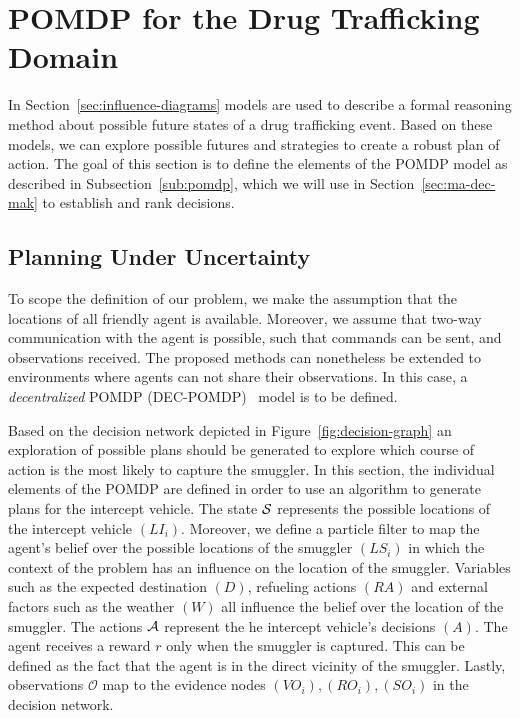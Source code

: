 \documentclass[conference]{IEEEtran}
\begin{document}

\section{POMDP for the Drug Trafficking Domain}
\label{sec:scenario-based-dm}

In Section~\ref{sec:influence-diagrams} models are used to describe a formal reasoning method about possible future states of a drug trafficking event. Based on these models, we can explore possible futures and strategies to create a robust plan of action. The goal of this section is to define the elements of the POMDP model as described in Subsection~\ref{sub:pomdp}, which we will use in Section~\ref{sec:ma-dec-mak} to establish and rank decisions.

\subsection{Planning Under Uncertainty}
\label{sub:plan-uncert}

To scope the definition of our problem, we make the assumption that the locations of all friendly agent is available. Moreover, we assume that two-way communication with the agent is possible, such that commands can be sent, and observations received. The proposed methods can nonetheless be extended to environments where agents can not share their observations. In this case, a \emph{decentralized} POMDP (DEC-POMDP)~\cite{dec-pomdp,oliehoek2008optimal} model is to be defined.

Based on the decision network depicted in Figure~\ref{fig:decision-graph} an exploration of possible plans should be generated to explore which course of action is the most likely to capture the smuggler. In this section, the individual elements of the POMDP are defined in order to use an algorithm to generate plans for the intercept vehicle. The state $\S$ represents the possible locations of the intercept vehicle $(LI_i)$. Moreover, we define a particle filter to map the agent's belief over the possible locations of the smuggler $(LS_i)$ in which the context of the problem has an influence on the location of the smuggler. Variables such as the expected destination $(D)$, refueling actions $(RA)$ and external factors such as the weather $(W)$ all influence the belief over the location of the smuggler. The actions $\A$ represent the he intercept vehicle's decisions $(A)$. The agent receives a reward $r$ only when the smuggler is captured. This can be defined as the fact that the agent is in the direct vicinity of the smuggler. Lastly, observations $\mathcal{O}$ map to the evidence nodes $(VO_i), (RO_i), (SO_i)$ in the decision network.
\end{document}

